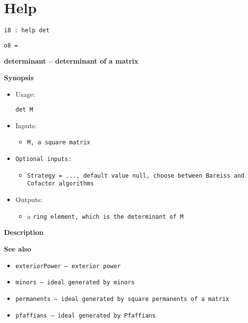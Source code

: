 \documentclass[12pt,a4paper]{amsart}
\begin{document}
\section{Help}
\smallskip
\begin{verbatim}
i8 : help det
\end{verbatim}
\noindent\verb|o8 = |
\par \medskip\noindent\begingroup\Large\bf
determinant -- determinant of a matrix\endgroup
\par \smallskip%

\par \medskip\noindent\begingroup\Large\bf
Synopsis\endgroup
\par \smallskip%
\begin{itemize}
\item 
\par Usage: 
\par \begingroup\tt det\ M\endgroup{}
\item Inputs:\begin{itemize}
\item \begingroup\tt M\endgroup{}, a square \begingroup\tt matrix\endgroup{}
\end{itemize}

\item \begingroup\tt Optional\ inputs\endgroup{}:\begin{itemize}
\item \begingroup\tt Strategy\endgroup{}\begingroup\tt \ ={}\ \endgroup{}\begingroup\tt ...\endgroup{}, default value null, choose between Bareiss and Cofactor algorithms
\end{itemize}

\item Outputs:\begin{itemize}
\item a \begingroup\tt ring\ element\endgroup{}, which is the determinant of \begingroup\tt M\endgroup{}
\end{itemize}

\end{itemize}

\par \medskip\noindent\begingroup\Large\bf
Description\endgroup
\par \smallskip%

\par \medskip\noindent\begingroup\Large\bf
See also\endgroup
\par \smallskip%
\begin{itemize}
\item \begingroup\tt exteriorPower\endgroup{} -- exterior power
\item \begingroup\tt minors\endgroup{} -- ideal generated by minors
\item \begingroup\tt permanents\endgroup{} -- ideal generated by square permanents of a matrix
\item \begingroup\tt pfaffians\endgroup{} -- ideal generated by Pfaffians
\end{itemize}
\end{document}
